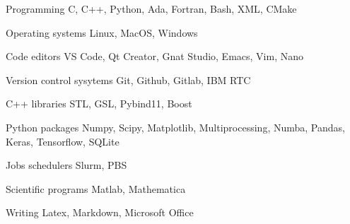 

\begin{cvskills}

    \cvskill
    {Programming} %
    {C, C++, Python, Ada, Fortran, Bash, XML, CMake} %

    \cvskill
    {Operating systems} %
    {Linux, MacOS, Windows} %

    \cvskill
    {Code editors} %
    {VS Code, Qt Creator, Gnat Studio, Emacs, Vim, Nano} %


    \cvskill
    {Version control sysytems} %
    {Git, Github, Gitlab, IBM RTC} %

    \cvskill
    {C++ libraries} %
    {STL, GSL, Pybind11, Boost}
    

    \cvskill
    {Python packages} %
    {Numpy, Scipy, Matplotlib, Multiprocessing, Numba, Pandas, Keras, Tensorflow, SQLite}

    \cvskill
    {Jobs schedulers} %
    {Slurm, PBS}
    
    \cvskill
    {Scientific programs} %
    {Matlab, Mathematica} %

    \cvskill
    {Writing} %
    {Latex, Markdown, Microsoft Office} %

\end{cvskills}